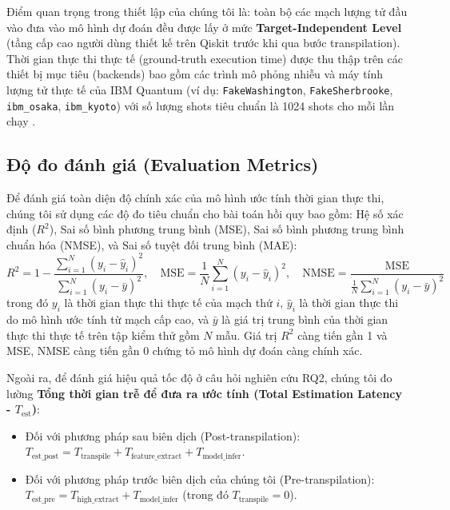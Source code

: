 \documentclass[11pt, a4paper]{article}
\begin{document}
Điểm quan trọng trong thiết lập của chúng tôi là: toàn bộ các mạch lượng tử đầu vào đưa vào mô hình dự đoán đều được lấy ở mức \textbf{Target-Independent Level} (tầng cấp cao người dùng thiết kế trên Qiskit \cite{javadi2024qiskit} trước khi qua bước transpilation). Thời gian thực thi thực tế (ground-truth execution time) được thu thập trên các thiết bị mục tiêu (backends) bao gồm các trình mô phỏng nhiễu và máy tính lượng tử thực tế của IBM Quantum (ví dụ: \texttt{FakeWashington}, \texttt{FakeSherbrooke}, \texttt{ibm\_osaka}, \texttt{ibm\_kyoto}) với số lượng shots tiêu chuẩn là 1024 shots cho mỗi lần chạy \cite{ma2025understanding}.

\subsection{Độ đo đánh giá (Evaluation Metrics)}
Để đánh giá toàn diện độ chính xác của mô hình ước tính thời gian thực thi, chúng tôi sử dụng các độ đo tiêu chuẩn cho bài toán hồi quy bao gồm: Hệ số xác định ($R^2$), Sai số bình phương trung bình (MSE), Sai số bình phương trung bình chuẩn hóa (NMSE), và Sai số tuyệt đối trung bình (MAE):
\begin{equation}
    R^2 = 1 - \frac{\sum_{i=1}^{N} (y_i - \hat{y}_i)^2}{\sum_{i=1}^{N} (y_i - \bar{y})^2}, \quad
    \text{MSE} = \frac{1}{N} \sum_{i=1}^{N} (y_i - \hat{y}_i)^2, \quad
    \text{NMSE} = \frac{\text{MSE}}{\frac{1}{N}\sum_{i=1}^{N} (y_i - \bar{y})^2}
\end{equation}
trong đó $y_i$ là thời gian thực thi thực tế của mạch thứ $i$, $\hat{y}_i$ là thời gian thực thi do mô hình ước tính từ mạch cấp cao, và $\bar{y}$ là giá trị trung bình của thời gian thực thi thực tế trên tập kiểm thử gồm $N$ mẫu. Giá trị $R^2$ càng tiến gần 1 và MSE, NMSE càng tiến gần 0 chứng tỏ mô hình dự đoán càng chính xác.

Ngoài ra, để đánh giá hiệu quả tốc độ ở câu hỏi nghiên cứu RQ2, chúng tôi đo lường \textbf{Tổng thời gian trễ để đưa ra ước tính (Total Estimation Latency - $T_{\text{est}}$)}:
\begin{itemize}
    \item Đối với phương pháp sau biên dịch (Post-transpilation): $T_{\text{est\_post}} = T_{\text{transpile}} + T_{\text{feature\_extract}} + T_{\text{model\_infer}}$.
    \item Đối với phương pháp trước biên dịch của chúng tôi (Pre-transpilation): $T_{\text{est\_pre}} = T_{\text{high\_extract}} + T_{\text{model\_infer}}$ (trong đó $T_{\text{transpile}} = 0$).
\end{itemize}
\end{document}
